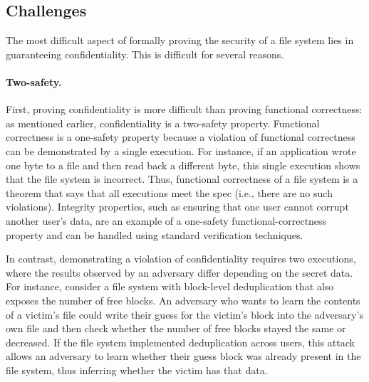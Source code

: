 


\subsection{Challenges}
\label{s:goal:chal}

The most difficult aspect of formally proving the security of a file system lies
in guaranteeing confidentiality.  This is difficult for several reasons.

\paragraph{Two-safety.}
First, proving confidentiality is more difficult than
proving functional correctness: as mentioned earlier, confidentiality
is a two-safety property.  Functional correctness is a one-safety
property because a violation of functional correctness can be demonstrated
by a single execution.  For instance, if an application wrote one byte to
a file and then read back a different byte, this single execution shows
that the file system is incorrect.  Thus, functional correctness
of a file system is a theorem that says that all executions meet the
spec (i.e., there are no such violations).  Integrity properties,
such as ensuring that one user cannot corrupt another user's data,
are an example of a one-safety functional-correctness property and can
be handled using standard verification techniques.

In contrast, demonstrating a violation of confidentiality requires
two executions, where the results observed by an adversary differ depending on
the secret data.
For instance, consider a file system with block-level deduplication that
also exposes the number of free blocks.  An adversary who wants to
learn the contents of a victim's file could write their guess for the
victim's block into the adversary's own file and then check whether
the number of free blocks stayed the same or decreased.  If the file
system implemented deduplication across users, this attack allows an
adversary to learn whether their guess block was already present in the
file system, thus inferring whether the victim has that data.


